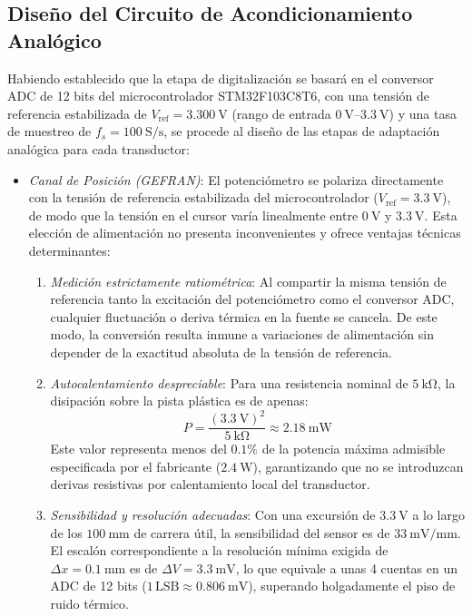 \subsection{Diseño del Circuito de Acondicionamiento Analógico}
Habiendo establecido que la etapa de digitalización se basará en el conversor ADC de 12 bits del microcontrolador
STM32F103C8T6, con una tensión de referencia estabilizada de $V_{\text{ref}} = \qty{3.300}{\volt}$ (rango de entrada
$\qtyrange{0}{3.3}{\volt}$) y una tasa de muestreo de $f_s = \qty{100}{\text{S/s}}$, se procede al diseño de las
etapas de adaptación analógica para cada transductor:
\begin{itemize}
    \item \emph{Canal de Posición (GEFRAN)}: El potenciómetro se polariza directamente con la tensión de referencia estabilizada del microcontrolador ($V_{\text{ref}} = \qty{+3.3}{\volt}$), de modo que la tensión en el cursor varía linealmente entre $\qty{0}{\volt}$ y $\qty{3.3}{\volt}$. Esta elección de alimentación no presenta inconvenientes y ofrece ventajas técnicas determinantes:
    \begin{enumerate}
        \item \emph{Medición estrictamente ratiométrica}: Al compartir la misma tensión de referencia tanto la excitación del potenciómetro como el conversor ADC, cualquier fluctuación o deriva térmica en la fuente se cancela. De este modo, la conversión resulta inmune a variaciones de alimentación sin depender de la exactitud absoluta de la tensión de referencia.
        \item \emph{Autocalentamiento despreciable}: Para una resistencia nominal de $\qty{5}{\kilo\ohm}$, la disipación sobre la pista plástica es de apenas:
        \[
            P = \frac{(\qty{3.3}{\volt})^2}{\qty{5}{\kilo\ohm}} \approx \qty{2.18}{\milli\watt}
        \]
        Este valor representa menos del $0.1\%$ de la potencia máxima admisible especificada por el fabricante ($\qty{2.4}{\watt}$), garantizando que no se introduzcan derivas resistivas por calentamiento local del transductor.
        \item \emph{Sensibilidad y resolución adecuadas}: Con una excursión de $\qty{3.3}{\volt}$ a lo largo de los $\qty{100}{\milli\meter}$ de carrera útil, la sensibilidad del sensor es de $\qty{33}{\milli\volt\per\milli\meter}$. El escalón correspondiente a la resolución mínima exigida de $\Delta x = \qty{0.1}{\milli\meter}$ es de $\Delta V = \qty{3.3}{\milli\volt}$, lo que equivale a unas 4 cuentas en un ADC de 12 bits ($1\,\text{LSB} \approx \qty{0.806}{\milli\volt}$), superando holgadamente el piso de ruido térmico.

\end{enumerate}
\end{itemize}
